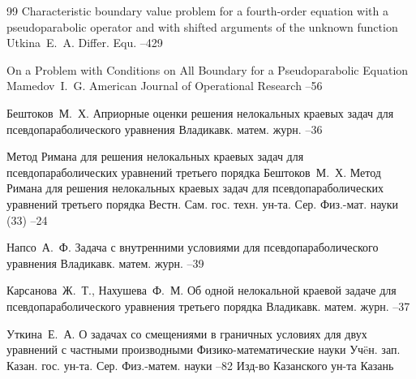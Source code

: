 \begin{thebibliography}{99}
\paper 	 Characteristic boundary value problem for a fourth-order equation with a pseudoparabolic operator and with shifted arguments of the unknown function 
\by  Utkina~E.~A.
\jour Differ. Equ.
--429


\paper On a Problem with Conditions on All Boundary for a Pseudoparabolic Equation
\by Mamedov~I.~G.
\jour American Journal of Operational Research
--56


\by  Бештоков~М.~Х.
\paper Априорные оценки решения нелокальных краевых задач для псевдопараболического уравнения
\jour Владикавк. матем. журн.
--36



\paper Метод Римана для решения нелокальных краевых задач для псевдопараболических уравнений третьего порядка
\by  Бештоков~М.~Х.
\paper Метод Римана для решения нелокальных краевых задач для псевдопараболических уравнений третьего порядка
\jour Вестн. Сам. гос. техн. ун-та. Сер. Физ.-мат. науки
(33)
--24

\by  Напсо~А.~Ф.
\paper Задача с внутренними условиями для псевдопараболического уравнения
\jour Владикавк. матем. журн.
--39


\by  Карсанова~Ж.~Т., Нахушева~Ф.~М.
\paper Об одной нелокальной краевой задаче для псевдопараболического уравнения третьего порядка
\jour Владикавк. матем. журн.
--37

\by  Уткина~Е.~А.
\paper О задачах со смещениями в граничных условиях для двух уравнений с частными производными
\inbook Физико-математические науки
\serial Уч\"eн. зап. Казан. гос. ун-та. Сер. Физ.-матем. науки
--82
\publ Изд-во Казанского ун-та
\publaddr Казань




\end{thebibliography}
